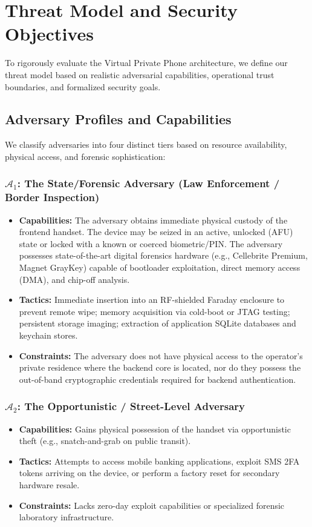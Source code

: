 \section{Threat Model and Security Objectives}
\label{sec:threat_model}

To rigorously evaluate the Virtual Private Phone architecture, we define our threat model based on realistic adversarial capabilities, operational trust boundaries, and formalized security goals.

\subsection{Adversary Profiles and Capabilities}
We classify adversaries into four distinct tiers based on resource availability, physical access, and forensic sophistication:

\subsubsection{$\mathcal{A}_1$: The State/Forensic Adversary (Law Enforcement / Border Inspection)}
\begin{itemize}
    \item \textbf{Capabilities:} The adversary obtains immediate physical custody of the frontend handset. The device may be seized in an active, unlocked (AFU) state or locked with a known or coerced biometric/PIN. The adversary possesses state-of-the-art digital forensics hardware (e.g., Cellebrite Premium, Magnet GrayKey) capable of bootloader exploitation, direct memory access (DMA), and chip-off analysis.
    \item \textbf{Tactics:} Immediate insertion into an RF-shielded Faraday enclosure to prevent remote wipe; memory acquisition via cold-boot or JTAG testing; persistent storage imaging; extraction of application SQLite databases and keychain stores.
    \item \textbf{Constraints:} The adversary does not have physical access to the operator's private residence where the backend core is located, nor do they possess the out-of-band cryptographic credentials required for backend authentication.
\end{itemize}

\subsubsection{$\mathcal{A}_2$: The Opportunistic / Street-Level Adversary}
\begin{itemize}
    \item \textbf{Capabilities:} Gains physical possession of the handset via opportunistic theft (e.g., snatch-and-grab on public transit). 
    \item \textbf{Tactics:} Attempts to access mobile banking applications, exploit SMS 2FA tokens arriving on the device, or perform a factory reset for secondary hardware resale.
    \item \textbf{Constraints:} Lacks zero-day exploit capabilities or specialized forensic laboratory infrastructure.
\end{itemize}

